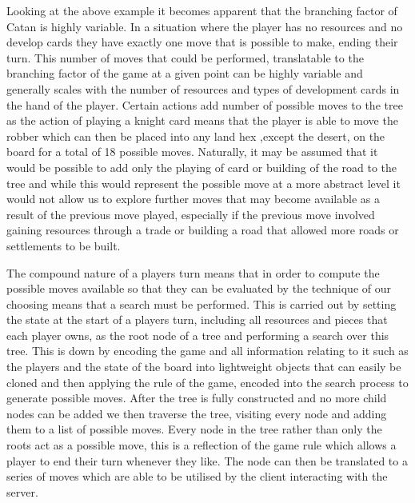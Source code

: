 \documentclass[]{article}
\begin{document}
\par Looking at the above example it becomes apparent that the branching factor of Catan is highly variable. In a situation where the player has no resources and no develop cards they have exactly one move that is possible to make, ending their turn. This number of moves that could be performed, translatable to the branching factor of the game at a given point can be highly variable and generally scales with the number of resources and types of development cards in the hand of the player. Certain actions add number of possible moves to the tree as the action of playing a knight card means that the player is able to move the robber which can then be placed into any land hex ,except the desert, on the board for a total of 18 possible moves. Naturally, it may be assumed that it would be possible to add only the playing of card or building of the road to the tree and while this would represent the possible move at a more abstract level it would not allow us to explore further moves that may become available as a result of the previous move played, especially if the previous move involved gaining resources through a trade or building a road that allowed more roads or settlements to be built.

\par The compound nature of a players turn means that in order to compute the possible moves available so that they can be evaluated by the technique of our choosing means that a search must be performed. This is carried out by setting the state at the start of a players turn, including all resources and pieces that each player owns, as the root node of a tree and performing a search over this tree. This is down by encoding the game and all information relating to it such as the players and the state of the board into lightweight objects that can easily be cloned and then applying the rule of the game, encoded into the search process to generate possible moves. After the tree is fully constructed and no more child nodes can be added we then traverse the tree, visiting every node and adding them to a list of possible moves. Every node in the tree rather than only the roots act as a possible move, this is a reflection of the game rule which allows a player to end their turn whenever they like. The node can then be translated to a series of moves which are able to be utilised by the client interacting with the server.
\end{document}
